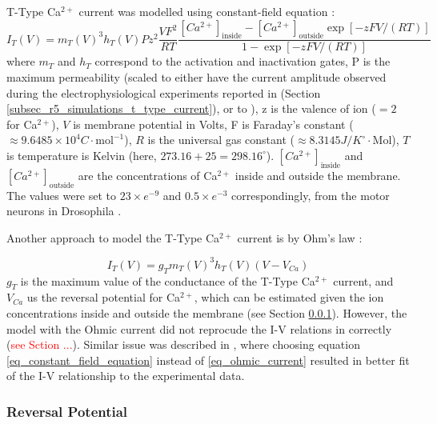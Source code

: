 \documentclass[../../workflow.tex]{subfiles}
\begin{document}
T-Type Ca$^{2+}$ current was modelled using constant-field equation \parencite{huguenardSimulationCurrentsInvolved1992}:
\begin{equation}\label{eq_constant_field_equation}
    I_T(V) = m_T(V)^3 h_T(V) P z^2 \frac{VF^2}{RT}\frac{[Ca^{2+}]_{\text{inside}} - [Ca^{2+}]_{\text{outside}} \exp{[-zFV/(RT)]} }{1 - \exp{[-zFV/(RT)]}}
\end{equation}
where $m_T$ and $h_T$ correspond to the activation and inactivation gates,
P is the maximum permeability (scaled to either have the current amplitude observed
during the electrophysiological experiments reported in \parencite{jeongCaa1TFlyTtype2015}
(Section \ref{subsec_r5_simulations_t_type_current}), or to ), z is the valence of ion ($=2$ for Ca$^{2+}$),
$V$ is membrane potential in Volts, F is Faraday's constant ($\approx 9.6485 \times 10^{4} C\cdot \text{mol}^{-1}$),
$R$ is the universal gas constant
($\approx 8.3145 J/K^\circ \cdot \text{Mol}$), $T$ is temperature is Kelvin (here, $273.16+25=298.16^{\circ}$).
$[Ca^{2+}]_{\text{inside}}$ and $[Ca^{2+}]_{\text{outside}}$ are the concentrations of Ca$^{2+}$ inside and
outside the membrane. The values were set to $23 \times e^{-9}$ and $0.5 \times e^{-3}$ correspondingly,
from the motor neurons in Drosophila
\parencite{frankenhaeuserActionCalciumElectrical1957}.

Another approach to model the T-Type Ca$^{2+}$ current is by Ohm's law \parencite{huguenardSimulationCurrentsInvolved1992, 
wangModelTtypeCalcium1991}:

\begin{equation}\label{eq_ohmic_current}
    I_T(V) = g_T m_T(V)^3 h_T(V) (V - V_{Ca})
\end{equation}
$g_T$ is the maximum value of the conductance of the T-Type
Ca$^{2+}$ current, and $V_{Ca}$ us the reversal potential for Ca$^{2+}$, which can be estimated
given the ion concentrations inside and outside the membrane (see Section \ref{subsbusec_reversal_potential}).
However, the model with the Ohmic current did not reprocude the I-V relations
in \parencite{jeongCaa1TFlyTtype2015} correctly (\textcolor{red}{see Sction ...}).
Similar issue was described in \parencite{huguenardSimulationCurrentsInvolved1992}, where choosing
equation \ref{eq_constant_field_equation} instead of \ref{eq_ohmic_current} resulted in better
fit of the I-V relationship to the experimental data.

\subsubsection{Reversal Potential}\label{subsbusec_reversal_potential}
\end{document}
